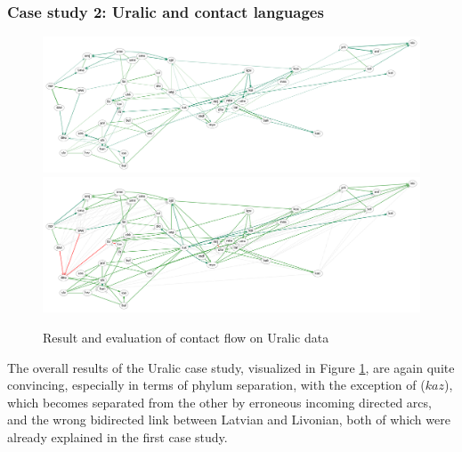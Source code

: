  \subsubsection{Case study 2: Uralic and contact languages}
 \begin{figure}
 \includegraphics[width=\textwidth]{figures/uralic-contact-fs-tss.pdf}
 \vspace*{5mm}
 \includegraphics[width=\textwidth]{figures/uralic-contact-fs-tss-eval.pdf}
 \caption{Result and evaluation of contact flow on Uralic data}
 \label{uralic-result-contact}
 \end{figure}
 
The overall results of the Uralic case study, visualized in Figure \ref{uralic-result-contact}, are again quite convincing, especially in terms of phylum separation, with the exception of  ($kaz$), which becomes separated from the other  by erroneous incoming directed arcs, and the wrong bidirected link between Latvian and Livonian, both of which were already explained in the first case study.
 
